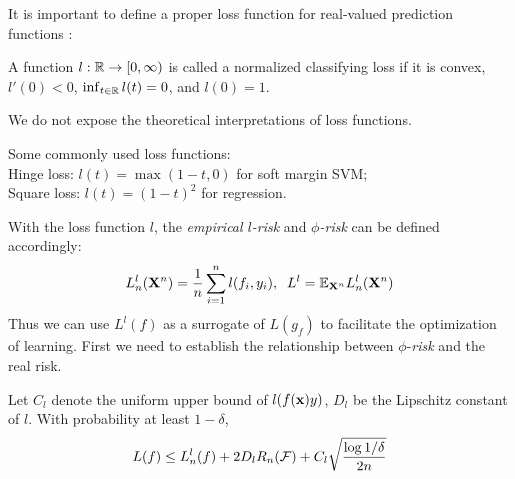 It is important to define a proper loss function for real-valued prediction functions
\cite{esiam/BousquetBL05,colt/YingC09}:
\begin{definition} \label{def:loss}
A function $l:{\mathbb R} \rightarrow [0, \infty)$ is called a normalized
classifying loss if it is convex, $l'(0) < 0$, $\inf_{t \in {\mathbb R}} l(t) = 0$,
and $l(0) = 1$.
\end{definition}
We do not expose the theoretical interpretations of loss functions.

\begin{example}
Some commonly used loss functions:\\
Hinge loss: $l(t) = \max(1 - t, 0)$ for soft margin SVM;\\
Square loss: $l(t) = (1 - t)^2$ for regression.
\end{example}

With the loss function $l$, the {\em empirical $l$-risk} and {\em $\phi$-risk}
can be defined accordingly:
\[
L^{l}_n(\mathbf X^n) = \frac{1}{n} \sum_{i=1}^n l(f_i, y_i),\;\;
L^{l} = {\mathbb E}_{\mathbf X^n}L^l_n(\mathbf X^n)
\]
Thus we can use $L^l(f)$ as a surrogate of $L(g_f)$ to facilitate the optimization
of learning. First we need to establish the relationship between $\phi$-{\em risk} and
the real risk.
\begin{theorem}\label{thm:L-L-phi}
Let $C_l$ denote the uniform upper bound of $l(f(\mathbf{x})y)$, $D_l$ be the
Lipschitz constant of $l$. With probability at least $1 - \delta$,
\begin{eqnarray}
L(f) \leq L^l_n(f) + 2D_l R_n(\f)+ C_l\sqrt{\frac{\log 1 / \delta}{2n}}
\label{eqn:L-L-phi}
\end{eqnarray}
\end{theorem}

